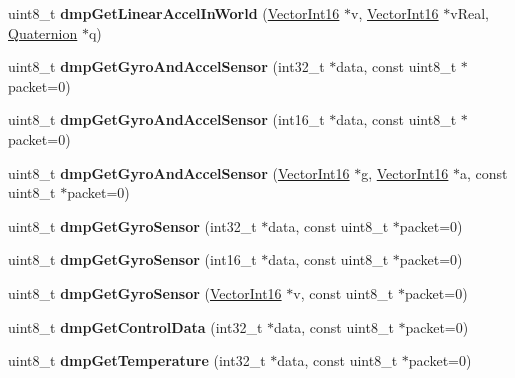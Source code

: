 \begin{DoxyCompactItemize}
uint8\+\_\+t {\bfseries dmp\+Get\+Linear\+Accel\+In\+World} (\mbox{\hyperlink{class_vector_int16}{Vector\+Int16}} $\ast$v, \mbox{\hyperlink{class_vector_int16}{Vector\+Int16}} $\ast$v\+Real, \mbox{\hyperlink{class_quaternion}{Quaternion}} $\ast$q)
\item 
\mbox{\label{class_m_p_u6050_acf5f700d018798475b93d56652e39788}} 
uint8\+\_\+t {\bfseries dmp\+Get\+Gyro\+And\+Accel\+Sensor} (int32\+\_\+t $\ast$data, const uint8\+\_\+t $\ast$packet=0)
\item 
\mbox{\label{class_m_p_u6050_ad8caffca939574f73c7c300baee339b7}} 
uint8\+\_\+t {\bfseries dmp\+Get\+Gyro\+And\+Accel\+Sensor} (int16\+\_\+t $\ast$data, const uint8\+\_\+t $\ast$packet=0)
\item 
\mbox{\label{class_m_p_u6050_a13b5eff727ce232fef884ee67df4487f}} 
uint8\+\_\+t {\bfseries dmp\+Get\+Gyro\+And\+Accel\+Sensor} (\mbox{\hyperlink{class_vector_int16}{Vector\+Int16}} $\ast$g, \mbox{\hyperlink{class_vector_int16}{Vector\+Int16}} $\ast$a, const uint8\+\_\+t $\ast$packet=0)
\item 
\mbox{\label{class_m_p_u6050_adfe0bc92f57cf489583d5c3b07d7aefb}} 
uint8\+\_\+t {\bfseries dmp\+Get\+Gyro\+Sensor} (int32\+\_\+t $\ast$data, const uint8\+\_\+t $\ast$packet=0)
\item 
\mbox{\label{class_m_p_u6050_a1c79849a8c39eb918945e98aea1dd878}} 
uint8\+\_\+t {\bfseries dmp\+Get\+Gyro\+Sensor} (int16\+\_\+t $\ast$data, const uint8\+\_\+t $\ast$packet=0)
\item 
\mbox{\label{class_m_p_u6050_ad77de2fac9ea2b9c5e94aa245670fe48}} 
uint8\+\_\+t {\bfseries dmp\+Get\+Gyro\+Sensor} (\mbox{\hyperlink{class_vector_int16}{Vector\+Int16}} $\ast$v, const uint8\+\_\+t $\ast$packet=0)
\item 
\mbox{\label{class_m_p_u6050_a7c11e874e2f0009503e0014dd2b1bf85}} 
uint8\+\_\+t {\bfseries dmp\+Get\+Control\+Data} (int32\+\_\+t $\ast$data, const uint8\+\_\+t $\ast$packet=0)
\item 
\mbox{\label{class_m_p_u6050_a799f73f0eb419057b5fe2a02d7f1905d}} 
uint8\+\_\+t {\bfseries dmp\+Get\+Temperature} (int32\+\_\+t $\ast$data, const uint8\+\_\+t $\ast$packet=0)

\end{DoxyCompactItemize}
